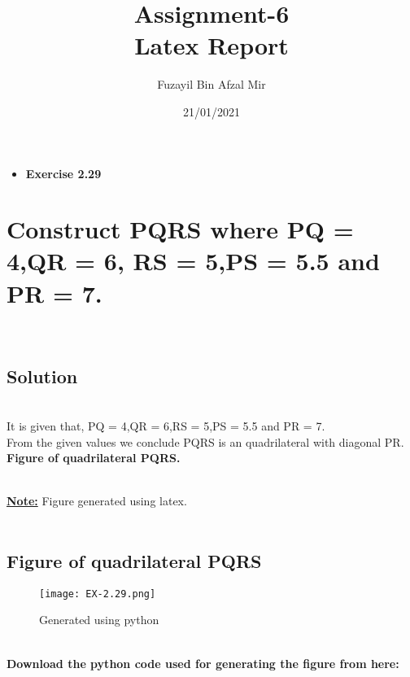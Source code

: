 \documentclass[a4paper,12pt]{article}
\title{Assignment-6\\ Latex Report}
\author{Fuzayil Bin Afzal Mir}
\date{21/01/2021}
\begin{document}
	\maketitle
	

 \newpage
 \begin{itemize}
	    \item \Large\textbf{Exercise 2.29}
	\end{itemize}
	\section{Construct PQRS where PQ = 4,QR = 6,
	RS = 5,PS = 5.5 and PR = 7.}\\
    	
\subsection{Solution} \\
It is given that,
 PQ = 4,QR = 6,RS = 5,PS = 5.5 and PR = 7.\\
 
 From the given values we conclude PQRS is an quadrilateral with diagonal PR.\\
 
  
  
  
\textbf{Figure of quadrilateral PQRS.}

\\
    \textbf{\underline{Note:}} {Figure generated using latex.}\\$$$$\\

\subsection{Figure of quadrilateral PQRS}
\begin{figure}
    \centering
    \texttt{[image: EX-2.29.png]}
    \caption{Generated using python}
    \label{fig:2}
\end{figure}

\\

  \textbf{Download the python code used for generating the figure from here:}
 
\end{document}
